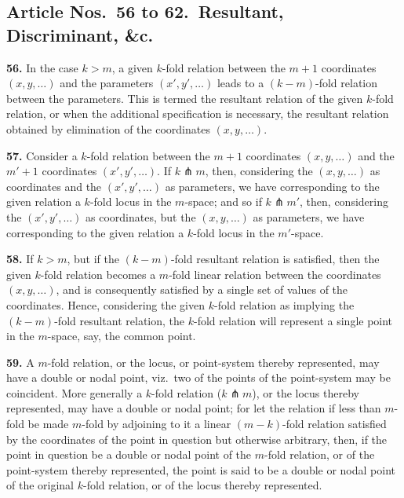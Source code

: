 \documentclass[11pt,a4paper]{article}
\theoremstyle{definition}
\begin{document}
\subsection*{Article Nos.\ 56 to 62.\ Resultant, Discriminant, \&c.}

\setcounter{page}{466}

\noindent\textbf{56.} In the case $k>m$, a given $k$-fold relation between the $m+1$ coordinates $(x,y,\ldots)$ and the parameters $(x',y',\ldots)$ leads to a $(k-m)$-fold relation between the parameters. This is termed the resultant relation of the given $k$-fold relation, or when the additional specification is necessary, the resultant relation obtained by elimination of the coordinates $(x,y,\ldots)$.

\noindent\textbf{57.} Consider a $k$-fold relation between the $m+1$ coordinates $(x,y,\ldots)$ and the $m'+1$ coordinates $(x',y',\ldots)$. If $k\pitchfork m$, then, considering the $(x,y,\ldots)$ as coordinates and the $(x',y',\ldots)$ as parameters, we have corresponding to the given relation a $k$-fold locus in the $m$-space; and so if $k\pitchfork m'$, then, considering the $(x',y',\ldots)$ as coordinates, but the $(x,y,\ldots)$ as parameters, we have corresponding to the given relation a $k$-fold locus in the $m'$-space.

\noindent\textbf{58.} If $k>m$, but if the $(k-m)$-fold resultant relation is satisfied, then the given $k$-fold relation becomes a $m$-fold linear relation between the coordinates $(x,y,\ldots)$, and is consequently satisfied by a single set of values of the coordinates. Hence, considering the given $k$-fold relation as implying the $(k-m)$-fold resultant relation, the $k$-fold relation will represent a single point in the $m$-space, say, the common point.

\noindent\textbf{59.} A $m$-fold relation, or the locus, or point-system thereby represented, may have a double or nodal point, viz.\ two of the points of the point-system may be coincident. More generally a $k$-fold relation ($k\pitchfork m$), or the locus thereby represented, may have a double or nodal point; for let the relation if less than $m$-fold be made $m$-fold by adjoining to it a linear $(m-k)$-fold relation satisfied by the coordinates of the point in question but otherwise arbitrary, then, if the point in question be a double or nodal point of the $m$-fold relation, or of the point-system thereby represented, the point is said to be a double or nodal point of the original $k$-fold relation, or of the locus thereby represented.
\end{document}
